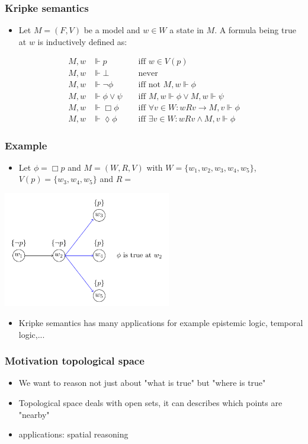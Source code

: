 \documentclass[hyperref={pdfpagelabels=false},t,10pt]{beamer}
\begin{document}
\begin{frame}
  \frametitle{Kripke semantics}
  \begin{itemize}
    \item Let $M = (F,V)$ be a model and $w \in W$ a state in $M$. A formula being true at $w$ is inductively defined as: 
  \end{itemize}

  \begin{align*}
    M, w &\Vdash p &&\text{ iff } w \in V(p) \\
    M, w &\Vdash \bot  &&\text{ never } \\
    M, w &\Vdash \neg \phi &&\text{ iff not } M, w \Vdash \phi \\ 
    M, w &\Vdash \phi \lor \psi &&\text{ iff } M,w \Vdash \phi \lor M,w \Vdash \psi \\
    M, w &\Vdash \Box \phi &&\text{ iff } \forall v \in W : wRv \rightarrow M, v \Vdash \phi \\
    M, w &\Vdash \lozenge \phi &&\text{ iff } \exists v \in W : wRv \land M,v \Vdash \phi
\end{align*}
  
\end{frame}

\begin{frame}
  \frametitle{Example}
  \begin{itemize}
    \item Let $\phi = \Box p$ and $M = (W,R,V)$ with $W = \{w_1,w_2,w_3,w_4,w_5\}$, $V(p) = \{w_3,w_4,w_5\}$ and $R = $
  \end{itemize}
  \centering
  \includegraphics[width=0.55\textwidth]{Example1.pdf}
  \pause
  \begin{itemize}
    \item Kripke semantics has many applications for example epistemic logic, temporal logic,...
  \end{itemize}
\end{frame}

\begin{frame}
  \frametitle{Motivation topological space}
  \begin{itemize}
    \item We want to reason not just about "what is true" but "where is true" \pause
    \item Topological space deals with open sets, it can describes which points are "nearby"
    \item applications: spatial reasoning %
    \end{itemize}
    \end{frame}
\end{document}

